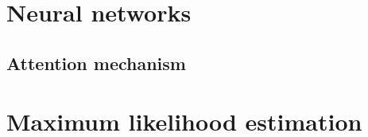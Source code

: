\label{sec:STAT}
\section{Neural networks}
\subsection{Attention mechanism}
\section{Maximum likelihood estimation}